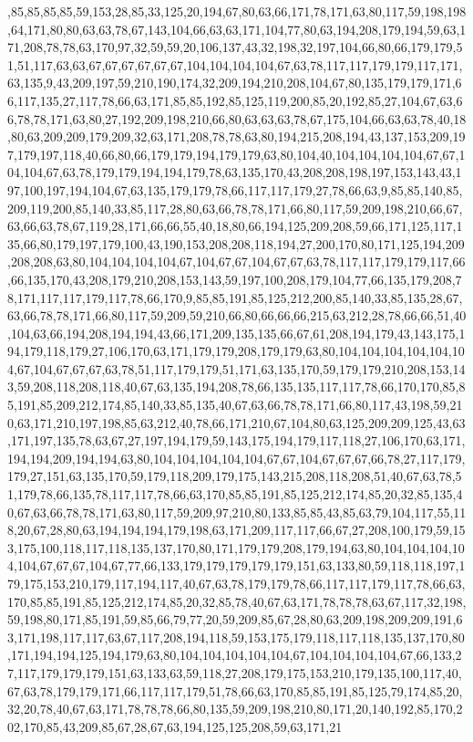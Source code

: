 ,85,85,85,85,59,153,28,85,33,125,20,194,67,80,63,66,171,78,171,63,80,117,59,198,198,64,171,80,80,63,63,78,67,143,104,66,63,63,171,104,77,80,63,194,208,179,194,59,63,171,208,78,78,63,170,97,32,59,59,20,106,137,43,32,198,32,197,104,66,80,66,179,179,51,51,117,63,63,67,67,67,67,67,67,104,104,104,104,67,63,78,117,117,179,179,117,171,63,135,9,43,209,197,59,210,190,174,32,209,194,210,208,104,67,80,135,179,179,171,66,117,135,27,117,78,66,63,171,85,85,192,85,125,119,200,85,20,192,85,27,104,67,63,66,78,78,171,63,80,27,192,209,198,210,66,80,63,63,63,78,67,175,104,66,63,63,78,40,18,80,63,209,209,179,209,32,63,171,208,78,78,63,80,194,215,208,194,43,137,153,209,197,179,197,118,40,66,80,66,179,179,194,179,179,63,80,104,40,104,104,104,104,67,67,104,104,67,63,78,179,179,194,194,179,78,63,135,170,43,208,208,198,197,153,143,43,197,100,197,194,104,67,63,135,179,179,78,66,117,117,179,27,78,66,63,9,85,85,140,85,209,119,200,85,140,33,85,117,28,80,63,66,78,78,171,66,80,117,59,209,198,210,66,67,63,66,63,78,67,119,28,171,66,66,55,40,18,80,66,194,125,209,208,59,66,171,125,117,135,66,80,179,197,179,100,43,190,153,208,208,118,194,27,200,170,80,171,125,194,209,208,208,63,80,104,104,104,104,67,104,67,67,104,67,67,63,78,117,117,179,179,117,66,66,135,170,43,208,179,210,208,153,143,59,197,100,208,179,104,77,66,135,179,208,78,171,117,117,179,117,78,66,170,9,85,85,191,85,125,212,200,85,140,33,85,135,28,67,63,66,78,78,171,66,80,117,59,209,59,210,66,80,66,66,66,215,63,212,28,78,66,66,51,40,104,63,66,194,208,194,194,43,66,171,209,135,135,66,67,61,208,194,179,43,143,175,194,179,118,179,27,106,170,63,171,179,179,208,179,179,63,80,104,104,104,104,104,104,67,104,67,67,67,63,78,51,117,179,179,51,171,63,135,170,59,179,179,210,208,153,143,59,208,118,208,118,40,67,63,135,194,208,78,66,135,135,117,117,78,66,170,170,85,85,191,85,209,212,174,85,140,33,85,135,40,67,63,66,78,78,171,66,80,117,43,198,59,210,63,171,210,197,198,85,63,212,40,78,66,171,210,67,104,80,63,125,209,209,125,43,63,171,197,135,78,63,67,27,197,194,179,59,143,175,194,179,117,118,27,106,170,63,171,194,194,209,194,194,63,80,104,104,104,104,104,67,67,104,67,67,67,66,78,27,117,179,179,27,151,63,135,170,59,179,118,209,179,175,143,215,208,118,208,51,40,67,63,78,51,179,78,66,135,78,117,117,78,66,63,170,85,85,191,85,125,212,174,85,20,32,85,135,40,67,63,66,78,78,171,63,80,117,59,209,97,210,80,133,85,85,43,85,63,79,104,117,55,118,20,67,28,80,63,194,194,194,179,198,63,171,209,117,117,66,67,27,208,100,179,59,153,175,100,118,117,118,135,137,170,80,171,179,179,208,179,194,63,80,104,104,104,104,104,67,67,67,104,67,77,66,133,179,179,179,179,179,151,63,133,80,59,118,118,197,179,175,153,210,179,117,194,117,40,67,63,78,179,179,78,66,117,117,179,117,78,66,63,170,85,85,191,85,125,212,174,85,20,32,85,78,40,67,63,171,78,78,78,63,67,117,32,198,59,198,80,171,85,191,59,85,66,79,77,20,59,209,85,67,28,80,63,209,198,209,209,191,63,171,198,117,117,63,67,117,208,194,118,59,153,175,179,118,117,118,135,137,170,80,171,194,194,125,194,179,63,80,104,104,104,104,104,67,104,104,104,104,67,66,133,27,117,179,179,179,151,63,133,63,59,118,27,208,179,175,153,210,179,135,100,117,40,67,63,78,179,179,171,66,117,117,179,51,78,66,63,170,85,85,191,85,125,79,174,85,20,32,20,78,40,67,63,171,78,78,78,66,80,135,59,209,198,210,80,171,20,140,192,85,170,202,170,85,43,209,85,67,28,67,63,194,125,125,208,59,63,171,21